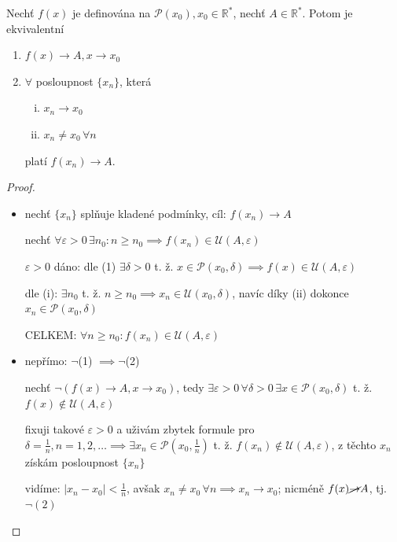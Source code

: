\begin{veta}
  Nechť $f(x)$ je definována na $\mathscr P(x_0), x_0 \in \mathbb R^*$, nechť $A\in \mathbb R^*$. Potom je ekvivalentní
  \begin{enumerate}[1.]
    \item $f(x) \to A, x \to x_0$
    \item $\forall$ posloupnost $\{x_n\}$, která \begin{enumerate}[i.]
      \item $x_n \to x_0$
      \item $x_n \neq x_0 \,\forall n$
    \end{enumerate}  platí $f(x_n) \to A.$
  \end{enumerate}
\end{veta}

\begin{proof}
  \begin{itemize}
    \item[(1) $\implies$ (2)] nechť $\{x_n\}$ splňuje kladené podmínky, cíl: $f(x_n) \to A$

    nechť $\forall \varepsilon > 0 \,\exists n_0: n \geq n_0 \implies f(x_n) \in \mathscr U(A, \varepsilon)$

    $\varepsilon > 0$ dáno: dle (1) $\exists \delta >0$ t. ž. $x\in \mathscr P(x_0, \delta) \implies f(x) \in \mathscr U(A, \varepsilon)$

    dle (i): $\exists n_0$ t. ž. $n \geq n_0 \implies x_n \in \mathscr U(x_0, \delta)$, navíc díky (ii) dokonce $x_n \in \mathscr P (x_0, \delta)$

    CELKEM: $\forall n \geq n_0: f(x_n) \in \mathscr U (A, \varepsilon)$
    \item[(2) $\implies$ (1)] nepřímo: $\neg$(1) $\implies \neg $(2)

    nechť $\neg(f(x) \to A, x \to x_0)$, tedy $\exists \varepsilon > 0 \, \forall \delta >0 \, \exists x \in \mathscr P(x_0, \delta)$ t. ž. $f(x) \notin \mathscr U(A, \varepsilon)$

    fixuji takové $\varepsilon > 0$ a uživám zbytek formule pro $\delta = \frac{1}{n}, n = 1, 2, \dots \implies \exists x_n \in \mathscr P(x_0, \frac{1}{n})$ t. ž. $f(x_n) \notin \mathscr U(A, \varepsilon)$, z těchto $x_n$ získám posloupnost $\{x_n\}$

    vidíme: $|x_n-x_0| < \frac{1}{n}$, avšak $x_n \neq x_0 \, \forall n \implies x_n \to x_0$; nicméně $f(x) \cancel{\to} A$, tj. $\neg (2)$
  \end{itemize}
\end{proof}

